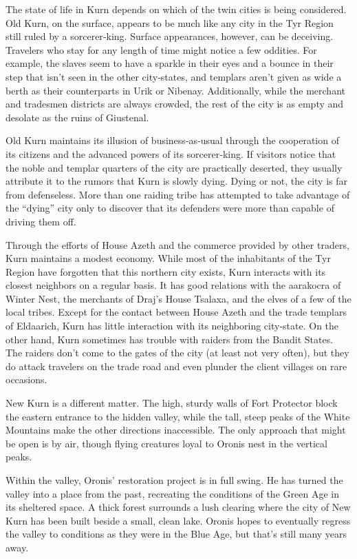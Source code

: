 {
	The state of life in Kurn depends on which of the twin cities is being considered. Old Kurn, on the surface, appears to be much like any city in the Tyr Region still ruled by a sorcerer‐king. Surface appearances, however, can be deceiving. Travelers who stay for any length of time might notice a few oddities. For example, the slaves seem to have a sparkle in their eyes and a bounce in their step that isn’t seen in the other city‐states, and templars aren’t given as wide a berth as their counterparts in Urik or Nibenay. Additionally, while the merchant and tradesmen districts are always crowded, the rest of the city is as empty and desolate as the ruins of Giustenal.

	Old Kurn maintains its illusion of business‐as‐usual through the cooperation of its citizens and the advanced powers of its sorcerer‐king. If visitors notice that the noble and templar quarters of the city are practically deserted, they usually attribute it to the rumors that Kurn is slowly dying. Dying or not, the city is far from defenseless. More than one raiding tribe has attempted to take advantage of the “dying” city only to discover that its defenders were more than capable of driving them off.

	Through the efforts of House Azeth and the commerce provided by other traders, Kurn maintains a modest economy. While most of the inhabitants of the Tyr Region have forgotten that this northern city exists, Kurn interacts with its closest neighbors on a regular basis. It has good relations with the aarakocra of Winter Nest, the merchants of Draj’s House Tsalaxa, and the elves of a few of the local tribes. Except for the contact between House Azeth and the trade templars of Eldaarich, Kurn has little interaction with its neighboring city‐state. On the other hand, Kurn sometimes has trouble with raiders from the Bandit States. The raiders don’t come to the gates of the city (at least not very often), but they do attack travelers on the trade road and even plunder the client villages on rare occasions.

	New Kurn is a different matter. The high, sturdy walls of Fort Protector block the eastern entrance to the hidden valley, while the tall, steep peaks of the White Mountains make the other directions inaccessible. The only approach that might be open is by air, though flying creatures loyal to Oronis nest in the vertical peaks.

	Within the valley, Oronis’ restoration project is in full swing. He has turned the valley into a place from the past, recreating the conditions of the Green Age in its sheltered space. A thick forest surrounds a lush clearing where the city of New Kurn has been built beside a small, clean lake. Oronis hopes to eventually regress the valley to conditions as they were in the Blue Age, but that’s still many years away.

}
